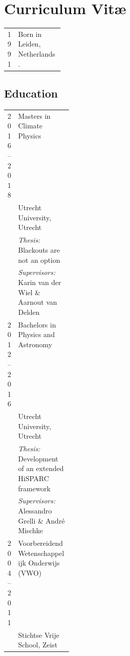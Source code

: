 

\chapter{Curriculum Vit\ae}

\newpage
\makeatletter
\authors{\@firstname\ {\titleshape\@lastname}}
\makeatother

\noindent
\begin{tabular}{p{0.13\linewidth}l}
1991 & Born in Leiden, Netherlands.
\end{tabular}

\section*{Education}
\begin{tabular}{p{0.15\linewidth}l}
    2016--2018 & Masters in Climate Physics\\
    & Utrecht University, Utrecht \\
    & \textit{Thesis:} Blackouts are not an option\\
    & \textit{Supervisors:} Karin van der Wiel \& Aarnout van Delden
    \\[0.2cm]
    2012--2016 & Bachelors in Physics and Astronomy \\
    & Utrecht University, Utrecht \\
    & \textit{Thesis:} Development of an extended HiSPARC framework \\
    & \textit{Supervisors:} Alessandro Grelli \& André Mischke
    \\[0.2cm]
    2004--2011 &  Voorbereidend Wetenschappelijk Onderwijs (VWO) \\
    & Stichtse Vrije School, Zeist
\end{tabular}

